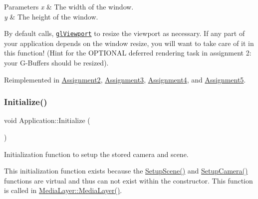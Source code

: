 \begin{DoxyParams}{Parameters}
{\em x} & The width of the window. \\
\hline
{\em y} & The height of the window.\\
\hline
\end{DoxyParams}
By default calls, \href{https://www.opengl.org/sdk/docs/man/html/glViewport.xhtml}{\tt gl\+Viewport} to resize the viewport as necessary. If any part of your application depends on the window resize, you will want to take care of it in this function! (Hint for the O\+P\+T\+I\+O\+N\+AL deferred rendering task in assignment 2\+: your \textquotesingle{}G-\/\+Buffers\textquotesingle{} should be resized). 

Reimplemented in \hyperlink{class_assignment2_a1af734567de5e8e73a2fd726fe3914f2}{Assignment2}, \hyperlink{class_assignment3_a851c637c83c8092d8adfb5c9f761daeb}{Assignment3}, \hyperlink{class_assignment4_ac79558272dc476db3ee4a99793f401f2}{Assignment4}, and \hyperlink{class_assignment5_a0e7325af72d41b95f9a19ebe1440e756}{Assignment5}.

\hypertarget{class_application_a17cf1ea4552d26a1c20f7d98d793d41d}{}\label{class_application_a17cf1ea4552d26a1c20f7d98d793d41d} 
\subsubsection{\texorpdfstring{Initialize()}{Initialize()}}
{\footnotesize\ttfamily void Application\+::\+Initialize (\begin{DoxyParamCaption}{ }\end{DoxyParamCaption})\hspace{0.3cm}{\ttfamily [virtual]}}



Initialization function to setup the stored camera and scene. 

This initialization function exists because the \hyperlink{class_application_aa8e8017ef8dd86293c96d0645e66d440}{Setup\+Scene()} and \hyperlink{class_application_a2eb61ca027f223a5c5ad1bf982481193}{Setup\+Camera()} functions are virtual and thus can not exist within the constructor. This function is called in \hyperlink{class_media_layer_aea3b3bc36411af90517692b110d2829a}{Media\+Layer\+::\+Media\+Layer()}. \hypertarget{class_application_a454a1d926759c4bfac47e730570a7743}{}\label{class_application_a454a1d926759c4bfac47e730570a7743} 
